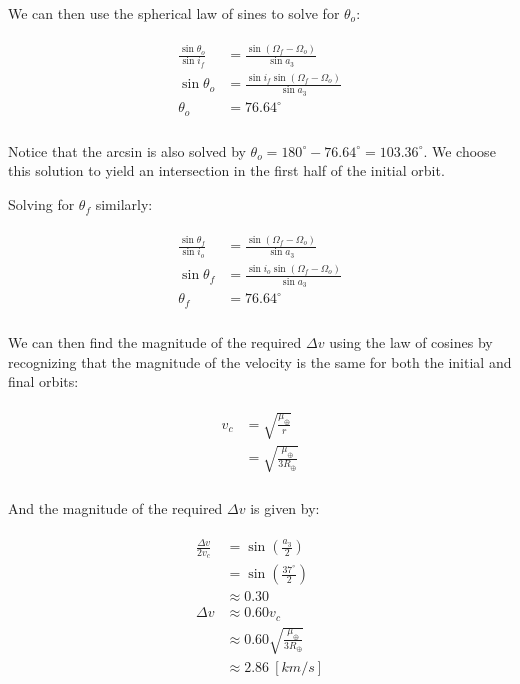 \documentclass[
]{article}
\begin{document}
We can then use the spherical law of sines to solve for \(\theta_o\):

\[\begin{aligned}
\begin{aligned}
    \frac{\sin\theta_o}{\sin i_f} &= \frac{\sin(\Omega_f - \Omega_o)}{\sin a_3} \\
    \sin\theta_o &= \frac{\sin i_f \sin(\Omega_f - \Omega_o)}{\sin a_3} \\
    \theta_o &= 76.64^\circ \\
\end{aligned}
\end{aligned}\]

Notice that the arcsin is also solved by
\(\theta_o = 180^\circ - 76.64^\circ = 103.36^\circ\). We choose this
solution to yield an intersection in the first half of the initial
orbit.

Solving for \(\theta_f\) similarly:

\[\begin{aligned}
\begin{aligned}
    \frac{\sin\theta_f}{\sin i_o} &= \frac{\sin(\Omega_f - \Omega_o)}{\sin a_3} \\
    \sin\theta_f &= \frac{\sin i_o \sin(\Omega_f - \Omega_o)}{\sin a_3} \\
    \theta_f &= 76.64^\circ \\
\end{aligned}
\end{aligned}\]

We can then find the magnitude of the required \(\Delta v\) using the
law of cosines by recognizing that the magnitude of the velocity is the
same for both the initial and final orbits:

\[\begin{aligned}
\begin{aligned}
    v_c &= \sqrt{\frac{\mu_\oplus}{r}} \\
    &= \sqrt{\frac{\mu_\oplus}{3R_\oplus}} \\
\end{aligned}
\end{aligned}\]

And the magnitude of the required \(\Delta v\) is given by:

\[\begin{aligned}
\begin{aligned}
    \frac{\Delta v}{2 v_c} &= \sin\left( \frac{a_3}{2} \right) \\
    &= \sin\left( \frac{37^\circ}{2} \right) \\
    &\approx 0.30 \\
    \Delta v &\approx 0.60 v_c \\
    &\approx 0.60 \sqrt{\frac{\mu_\oplus}{3R_\oplus}} \\
    &\approx 2.86 \: [km/s] \\
\end{aligned}
\end{aligned}\]
\end{document}
